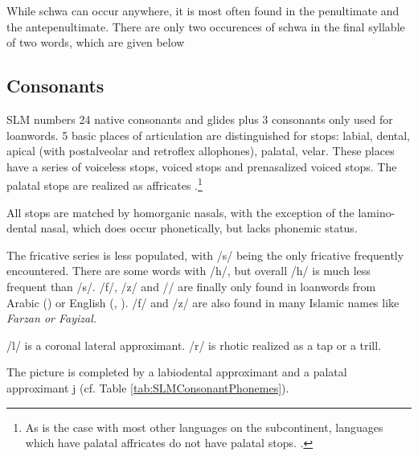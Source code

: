 While schwa can occur anywhere, it is most often found in the penultimate and the antepenultimate. There are only two occurences of schwa in the final syllable of two words, which are given below 


\subsection{Consonants}\label{sec:phon:Consonants}
SLM numbers 24 native consonants and glides plus 3 consonants only used for loanwords. 5 basic places of articulation are distinguished for stops: labial, dental, apical (with postalveolar and retroflex allophones), palatal, velar. These places have a series of voiceless stops, voiced stops and prenasalized voiced stops. The palatal stops are realized as affricates \citep[For the general treatment of affricates as strident stops see][]{JakobsonEtAl1952speechanalysis,Clements1999affr, Kehrein2002affr}.\footnote{As is the case with most other languages on the subcontinent,  languages which have palatal affricates do not have palatal stops. \citep[67]{Ramaswami1999}.}

All stops are matched by homorganic nasals, with the exception of the lamino-dental nasal, which does occur phonetically, but lacks phonemic status.

The fricative series is less populated, with /s/ being the only fricative frequently encountered. There are some words with /h/, but overall /h/ is much less frequent than /s/. /f/, /z/ and /\sh/ are finally only found in loanwords from Arabic () or English (, ). /f/ and /z/ are also found in many Islamic names like \em Farzan \em or \em Fayizal\em.

/l/ is a coronal lateral approximant. /r/ is rhotic realized as a tap or a trill. 

The picture is completed by a labiodental approximant \V{} and a palatal approximant j (cf. Table \ref{tab:SLMConsonantPhonemes}).

